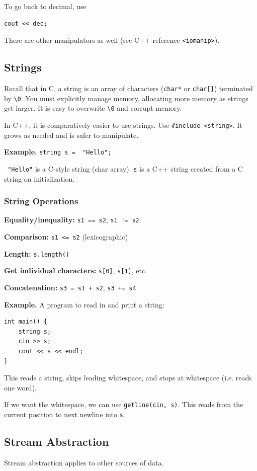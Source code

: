\documentclass[11pt]{article}
\theoremstyle{definition}
\begin{document}
To go back to decimal, use
\begin{lstlisting}
cout << dec;
\end{lstlisting}
There are other manipulators as well (see C++ reference {\tt <iomanip>}).

\subsection{Strings}
Recall that in C, a string is an array of characters ({\tt char*} or {\tt char[]}) terminated by {\tt \textbackslash0}.
You must explicitly manage memory, allocating more memory as strings get larger. It is easy to overwrite {\tt \textbackslash0} and corrupt memory.

In C++, it is comparatively easier to use strings. Use {\tt \#include <string>}. It grows as needed and is safer to manipulate. 

{\bf Example.} {\tt string s = {\color{mauve} "Hello"};}

{\tt {\color{mauve} "Hello"}} is a C-style string (char array). {\tt s} is a C++ string created from a C string on initialization.

\subsubsection*{String Operations}

{\bf Equality/inequality:} {\tt s1 == s2}, {\tt s1 != s2}

{\bf Comparison:} {\tt s1 <= s2} (lexicographic)

{\bf Length:} {\tt s.length()}

{\bf Get individual characters:} {\tt s[0]}, {\tt s[1]}, etc.

{\bf Concatenation:} {\tt s3 = s1 + s2}, {\tt s3 += s4}

{\bf Example.} A program to read in and print a string:
\begin{lstlisting}
int main() {
    string s;
    cin >> s; 
    cout << s << endl;
}
\end{lstlisting}
This reads a string, skips leading whitespace, and stops at whitespace (i.e. reads one word). 

If we want the whitespace, we can use {\tt getline(cin, s)}. This reads from the current position to next newline into {\tt s}. 

\subsection{Stream Abstraction}
Stream abstraction applies to other sources of data.
\end{document}
